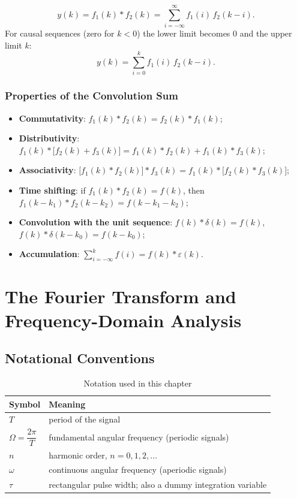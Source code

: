 \begin{equation}
    y(k)=f_1(k)*f_2(k)=\sum_{i=-\infty}^{\infty}f_1(i)\,f_2(k-i).
\end{equation}
For causal sequences (zero for $k<0$) the lower limit becomes $0$ and the
upper limit $k$:
\[
    y(k)=\sum_{i=0}^{k}f_1(i)\,f_2(k-i).
\]

\subsection{Properties of the Convolution Sum}

\begin{itemize}
    \item \textbf{Commutativity}: $f_1(k)*f_2(k)=f_2(k)*f_1(k)$;
    \item \textbf{Distributivity}: $f_1(k)*\bigl[f_2(k)+f_3(k)\bigr]=f_1(k)*f_2(k)+f_1(k)*f_3(k)$;
    \item \textbf{Associativity}: $\bigl[f_1(k)*f_2(k)\bigr]*f_3(k)=f_1(k)*\bigl[f_2(k)*f_3(k)\bigr]$;
    \item \textbf{Time shifting}: if $f_1(k)*f_2(k)=f(k)$, then
          $f_1(k-k_1)*f_2(k-k_2)=f(k-k_1-k_2)$;
    \item \textbf{Convolution with the unit sequence}: $f(k)*\delta(k)=f(k)$,
          $f(k)*\delta(k-k_0)=f(k-k_0)$;
    \item \textbf{Accumulation}: $\displaystyle\sum_{i=-\infty}^{k}f(i)=f(k)*\varepsilon(k)$.
\end{itemize}

\chapter{The Fourier Transform and Frequency-Domain Analysis}

\section{Notational Conventions}

\begin{table}[htbp]
\centering
\caption{Notation used in this chapter}
\begin{tabular}{@{}ll@{}}
\toprule
Symbol & Meaning \\
\midrule
$T$ & period of the signal \\
$\Omega=\dfrac{2\pi}{T}$ & fundamental angular frequency (periodic signals) \\
$n$ & harmonic order, $n=0,1,2,\dots$ \\
$\omega$ & continuous angular frequency (aperiodic signals) \\
$\tau$ & rectangular pulse width; also a dummy integration variable \\
\bottomrule
\end{tabular}
\end{table}

